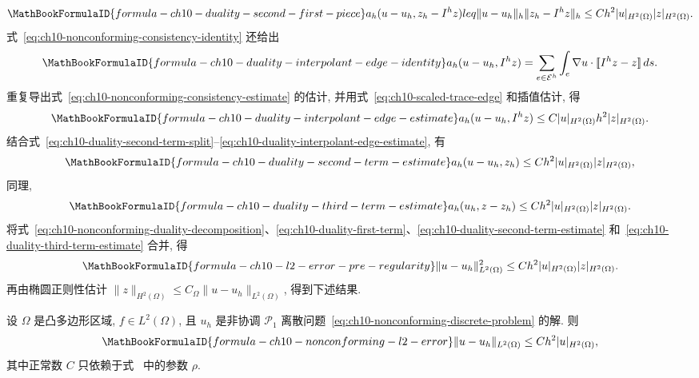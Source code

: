 \begin{equation}
\MathBookFormulaID{formula-ch10-duality-second-first-piece}
\label{eq:ch10-duality-second-first-piece}
a_h(u-u_h,z_h-I^hz)leq\|u-u_h\|_h\|z_h-I^hz\|_h
\leq Ch^2|u|_{H^2(\Omega)}|z|_{H^2(\Omega)}.
\end{equation}
式~\eqref{eq:ch10-nonconforming-consistency-identity} 还给出
\[
\MathBookFormulaID{formula-ch10-duality-interpolant-edge-identity}
a_h(u-u_h,I^hz)=\sum_{e\in\mathcal E^h}\int_e\nabla u\cdot[\![I^hz-z]\!]\,ds.
\]
重复导出式~\eqref{eq:ch10-nonconforming-consistency-estimate} 的估计, 并用式~\eqref{eq:ch10-scaled-trace-edge} 和插值估计, 得
\begin{equation}
\MathBookFormulaID{formula-ch10-duality-interpolant-edge-estimate}
\label{eq:ch10-duality-interpolant-edge-estimate}
a_h(u-u_h,I^hz)\leq C|u|_{H^2(\Omega)}h^2|z|_{H^2(\Omega)}.
\end{equation}
结合式~\eqref{eq:ch10-duality-second-term-split}--\eqref{eq:ch10-duality-interpolant-edge-estimate}, 有
\begin{equation}
\MathBookFormulaID{formula-ch10-duality-second-term-estimate}
\label{eq:ch10-duality-second-term-estimate}
a_h(u-u_h,z_h)\leq Ch^2|u|_{H^2(\Omega)}|z|_{H^2(\Omega)},
\end{equation}
同理,
\begin{equation}
\MathBookFormulaID{formula-ch10-duality-third-term-estimate}
\label{eq:ch10-duality-third-term-estimate}
a_h(u_h,z-z_h)\leq Ch^2|u|_{H^2(\Omega)}|z|_{H^2(\Omega)}.
\end{equation}
将式~\eqref{eq:ch10-nonconforming-duality-decomposition}、\eqref{eq:ch10-duality-first-term}、\eqref{eq:ch10-duality-second-term-estimate} 和~\eqref{eq:ch10-duality-third-term-estimate} 合并, 得
\[
\MathBookFormulaID{formula-ch10-l2-error-pre-regularity}
\|u-u_h\|_{L^2(\Omega)}^2\leq Ch^2|u|_{H^2(\Omega)}|z|_{H^2(\Omega)}.
\]
再由椭圆正则性估计 $\|z\|_{H^2(\Omega)}\leq C_\Omega\|u-u_h\|_{L^2(\Omega)}$, 得到下述结果.

\begin{Theorem}
\label{thm:ch10-nonconforming-l2-error}
设 $\Omega$ 是凸多边形区域, $f\in L^2(\Omega)$, 且 $u_h$ 是非协调 $\mathcal P_1$ 离散问题~\eqref{eq:ch10-nonconforming-discrete-problem} 的解. 则
\[
\MathBookFormulaID{formula-ch10-nonconforming-l2-error}
\|u-u_h\|_{L^2(\Omega)}\leq Ch^2|u|_{H^2(\Omega)},
\]
其中正常数 $C$ 只依赖于式~ 中的参数 $\rho$.
\end{Theorem}

